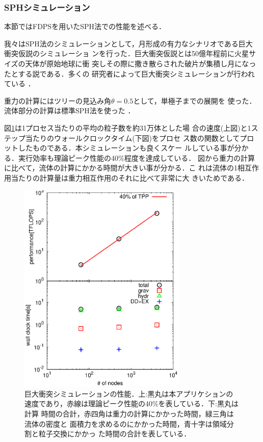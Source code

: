 \documentclass[submit,techreq,noauthor]{ipsj}
\begin{document}
\subsubsection{SPHシミュレーション}

本節ではFDPSを用いたSPH法での性能を述べる．

我々はSPH法のシミュレーションとして，月形成の有力なシナリオである巨大
衝突仮説\cite{1976LPI.....7..120C,1975Icar...24..504H}のシミュレーショ
ンを行った．巨大衝突仮説とは50億年程前に火星サイズの天体が原始地球に衝
突しその際に撒き散らされた破片が集積し月になったとする説である．多くの
研究者によって巨大衝突シミュレーションが行われている
\cite{1986Icar...66..515B,2013Icar..222..200C,2014NatGe...7..564A}．

重力の計算にはツリーの見込み角$\theta = 0.5$として，単極子までの展開を
使った．流体部分の計算は標準SPH法を使った
\cite{1997JCoPh.136..298M,2009NewAR..53...78R,2010ARA&A..48..391S}．

図\ref{fig:bench_gi}は1プロセス当たりの平均の粒子数を約31万体とした場
合の速度(上図)と1ステップ当たりのウォールクロックタイム(下図)をプロセ
ス数の関数としてプロットしたものである．本シミュレーションも良くスケー
ルしている事が分かる．実行効率も理論ピーク性能の40\%程度を達成している．
図から重力の計算に比べて，流体の計算にかかる時間が大きい事が分かる．こ
れは流体の1相互作用当たりの計算量は重力相互作用のそれに比べて非常に大
きいためである．

\begin{figure}[!h]
  \begin{center}
    \includegraphics[width=8cm]{bench_gi.eps}
  \end{center}
  \caption{巨大衝突シミュレーションの性能．上:黒丸は本アプリケションの
    速度であり，赤線は理論ピーク性能の40\%を表している．下:黒丸は計算
    時間の合計，赤四角は重力の計算にかかった時間，緑三角は流体の密度と
    面積力を求めるのにかかった時間，青十字は領域分割と粒子交換にかかっ
    た時間の合計を表している．}
  \label{fig:bench_gi}
\end{figure}
\end{document}
